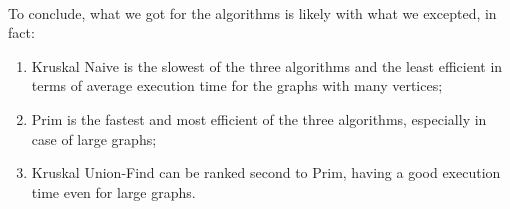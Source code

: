 \\
\noindent
To conclude, what we got for the algorithms is likely with what we excepted, in fact:
\begin{enumerate}
    \item Kruskal Naive is the slowest of the three algorithms and the least efficient in terms of average execution time for the graphs with many vertices;
    \item Prim is the fastest and most efficient of the three algorithms, especially in case of large graphs;
    \item Kruskal Union-Find can be ranked second to Prim, having a good execution time even for large graphs.
\end{enumerate} 
